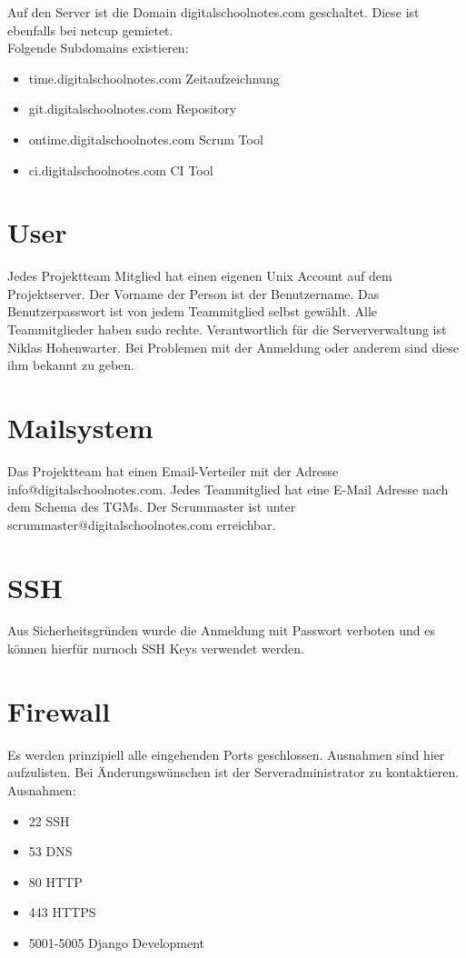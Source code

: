 \documentclass[12pt,a4paper,oneside,ngerman]{scrartcl}
\begin{document}
Auf den Server ist die Domain digitalschoolnotes.com geschaltet. Diese ist ebenfalls bei netcup gemietet.\\

Folgende Subdomains existieren:

\begin{itemize}
\item time.digitalschoolnotes.com \hfill Zeitaufzeichnung
\item git.digitalschoolnotes.com \hfill Repository
\item ontime.digitalschoolnotes.com \hfill Scrum Tool
\item ci.digitalschoolnotes.com \hfill CI Tool
\end{itemize}

\section{User}
Jedes Projektteam Mitglied hat einen eigenen Unix Account auf dem Projektserver. Der Vorname der Person ist der Benutzername. Das Benutzerpasswort ist von jedem Teammitglied selbst gewählt. Alle Teammitglieder haben sudo rechte. Verantwortlich für die Serververwaltung ist Niklas Hohenwarter. Bei Problemen mit der Anmeldung oder anderem sind diese ihm bekannt zu geben.

\section{Mailsystem}
Das Projektteam hat einen Email-Verteiler mit der Adresse info@digitalschoolnotes.com. Jedes Teammitglied hat eine E-Mail Adresse nach dem Schema des TGMs. Der Scrummaster ist unter scrummaster@digitalschoolnotes.com erreichbar.

\section{SSH}
Aus Sicherheitsgründen wurde die Anmeldung mit Passwort verboten und es können hierfür nurnoch SSH Keys verwendet werden.
\newpage

\section{Firewall}
Es werden prinzipiell alle eingehenden Ports geschlossen. Ausnahmen sind hier aufzulisten. Bei Änderungswünschen ist der Serveradministrator zu kontaktieren.\\

Ausnahmen:
\begin{itemize}
\item 22	SSH
\item 53	DNS
\item 80	HTTP
\item 443	HTTPS
\item 5001-5005 Django Development
\end{itemize}
\end{document}
